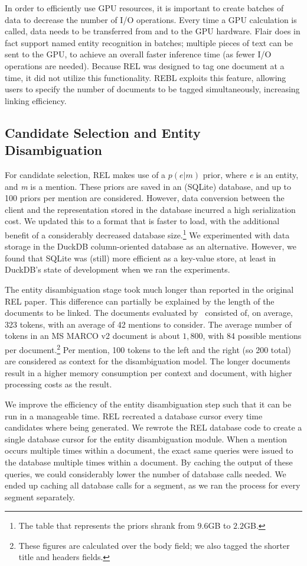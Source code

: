 In order to efficiently use GPU resources, it is important to create batches of data to decrease the number of I/O operations. Every time a GPU calculation is called, data needs to be transferred from and to the GPU hardware. 
Flair does in fact support named entity recognition in batches; multiple pieces of text can be sent to the GPU, to achieve an overall faster inference time (as fewer I/O operations are needed). 
Because REL was designed to tag one document at a time, it did not utilize this functionality. REBL exploits this feature, allowing users to specify the number of documents to be tagged simultaneously, increasing linking efficiency. 

\subsection{Candidate Selection and Entity Disambiguation}
For candidate selection, REL makes use of a $p(e|m)$ prior, where \textit{e} is an entity, and \textit{m} is a mention. These priors are saved in an (SQLite) database, and up to 100 priors per mention are considered. However, data conversion between the client and the representation stored in the database incurred a high serialization cost. We updated this to a format that is faster to load, with the additional benefit of a considerably decreased database size.\footnote{The table that represents the priors shrank from $9.6$GB to $2.2$GB.}
We experimented with data storage in the DuckDB column-oriented database as an alternative. However, we found that SQLite was (still) more efficient as a key-value store, at least in DuckDB's state of development when we ran the experiments.

The entity disambiguation stage took much longer than reported in the original REL paper. This difference can partially be explained by the length of the documents to be linked. The documents evaluated by~\citet{rel} consisted of, on average, 323 tokens, with an average of 42 mentions to consider. The average number of tokens in an MS MARCO v2 document is about $1,800$, with 84 possible mentions per document.\footnote{These figures are calculated over the body field; we also tagged the shorter title and headers fields.}
Per mention, 100 tokens to the left and the right (so 200 total) are considered as context for the disambiguation model. 
The longer documents result in a higher memory consumption per context and document, with higher processing costs as the result.

We improve the efficiency of the entity disambiguation step such that it can be run in a manageable time. REL recreated a database cursor every time candidates where being generated. We rewrote the REL database code to create a single database cursor for the entity disambiguation module. 
When a mention occurs multiple times within a document, the exact same queries were issued to the database multiple times within a document.  By caching the output of these queries, we could considerably lower the number of database calls needed. We ended up caching all database calls for a segment, as we ran the process for every segment separately. 

